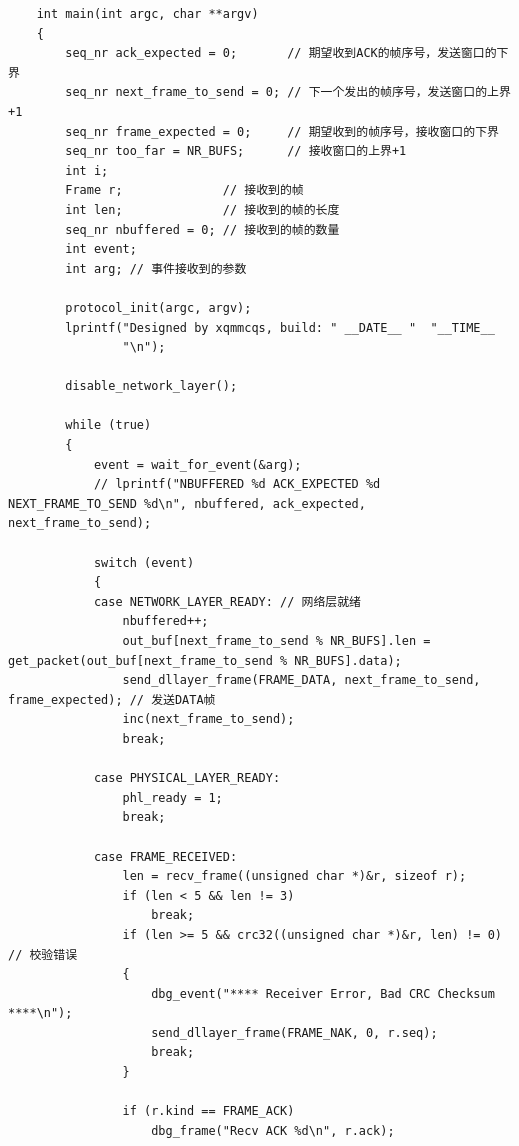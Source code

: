\documentclass[lang=cn,11pt,a4paper,cite=authornum]{paper}
\begin{document}
\begin{code}
\begin{verbatim}
    int main(int argc, char **argv)
    {
        seq_nr ack_expected = 0;       // 期望收到ACK的帧序号，发送窗口的下界
        seq_nr next_frame_to_send = 0; // 下一个发出的帧序号，发送窗口的上界+1
        seq_nr frame_expected = 0;     // 期望收到的帧序号，接收窗口的下界
        seq_nr too_far = NR_BUFS;      // 接收窗口的上界+1
        int i;
        Frame r;              // 接收到的帧
        int len;              // 接收到的帧的长度
        seq_nr nbuffered = 0; // 接收到的帧的数量
        int event;
        int arg; // 事件接收到的参数
    
        protocol_init(argc, argv);
        lprintf("Designed by xqmmcqs, build: " __DATE__ "  "__TIME__
                "\n");
    
        disable_network_layer();
    
        while (true)
        {
            event = wait_for_event(&arg);
            // lprintf("NBUFFERED %d ACK_EXPECTED %d NEXT_FRAME_TO_SEND %d\n", nbuffered, ack_expected, next_frame_to_send);
    
            switch (event)
            {
            case NETWORK_LAYER_READY: // 网络层就绪
                nbuffered++;
                out_buf[next_frame_to_send % NR_BUFS].len = get_packet(out_buf[next_frame_to_send % NR_BUFS].data);
                send_dllayer_frame(FRAME_DATA, next_frame_to_send, frame_expected); // 发送DATA帧
                inc(next_frame_to_send);
                break;
    
            case PHYSICAL_LAYER_READY:
                phl_ready = 1;
                break;
    
            case FRAME_RECEIVED:
                len = recv_frame((unsigned char *)&r, sizeof r);
                if (len < 5 && len != 3)
                    break;
                if (len >= 5 && crc32((unsigned char *)&r, len) != 0) // 校验错误
                {
                    dbg_event("**** Receiver Error, Bad CRC Checksum ****\n");
                    send_dllayer_frame(FRAME_NAK, 0, r.seq);
                    break;
                }
    
                if (r.kind == FRAME_ACK)
                    dbg_frame("Recv ACK %d\n", r.ack);
    

\end{verbatim}
\end{code}
\end{document}
